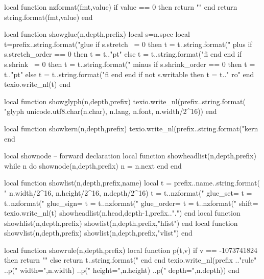 
%
%
%
\luacode
local function nzformat(fmt,value)
  if value == 0 then return "" end
  return string.format(fmt,value)
end

local function showglue(n,depth,prefix)
  local s=n.spec
  local t=prefix..string.format("glue %
  if s.stretch ~= 0 then
    t = t..string.format(" plus %
    if s.stretch_order == 0 then t = t.."pt"
    else t = t..string.format("fi%
    end
  end
  if s.shrink ~= 0 then
    t = t..string.format(" minus %
    if s.shrink_order == 0 then t = t.."pt"
    else t = t..string.format("fi%
    end
  end
  if not s.writable then t = t.." ro" end
  texio.write_nl(t)
end

local function showglyph(n,depth,prefix)
  texio.write_nl(prefix..string.format(
    "glyph %
    unicode.utf8.char(n.char),
    n.lang, n.font, n.width/2^16))
end

local function showkern(n,depth,prefix)
  texio.write_nl(prefix..string.format("kern %
end

local shownode -- forward declaration
local function showheadlist(n,depth,prefix)
  while n do
    shownode(n,depth,prefix)
    n = n.next
  end
end

local function showlist(n,depth,prefix,name)
  local t = prefix..name..string.format(
    " %
    n.width/2^16, n.height/2^16, n.depth/2^16)
  t = t..nzformat(" glue_set=%
  t = t..nzformat(" glue_sign=%
  t = t..nzformat(" glue_order=%
  t = t..nzformat(" shift=%
  texio.write_nl(t)
  showheadlist(n.head,depth-1,prefix..".")
end
local function showhlist(n,depth,prefix) showlist(n,depth,prefix,"hlist") end
local function showvlist(n,depth,prefix) showlist(n,depth,prefix,"vlist") end

local function showrule(n,depth,prefix)
  local function p(t,v)
    if v == -1073741824 then return ""
    else return t..string.format("%
    end
  end
  texio.write_nl(prefix
    .."rule"
    ..p(" width=",n.width)
    ..p(" height=",n.height)
    ..p(" depth=",n.depth))
end

